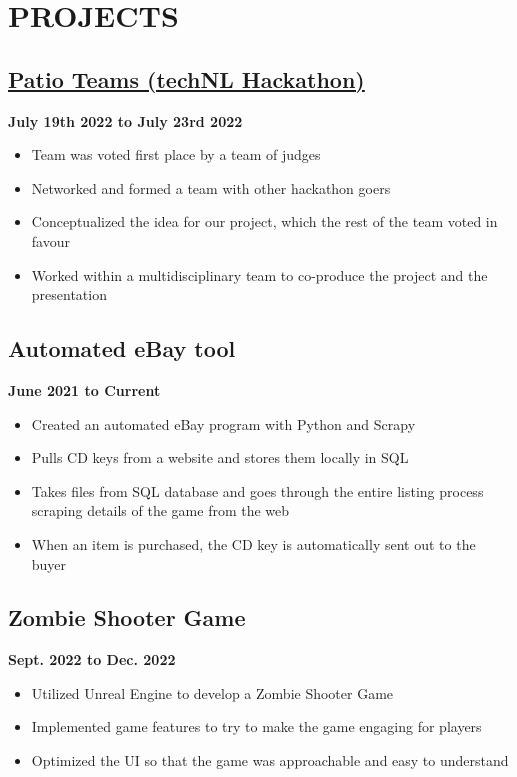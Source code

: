 \documentclass[12pt]{extarticle}
\begin{document}
\section*{PROJECTS}
\subsection*{\href{https://technl.ca/2022/07/28/techfwd-conclusion/}{Patio Teams (techNL Hackathon)}
} \hfill \textbf{July 19th 2022 to July 23rd 2022}
\begin{itemize}
	\item Team was voted first place by a team of judges
  \item Networked and formed a team with other hackathon goers
  \item Conceptualized the idea for our project, which the rest of the team voted in favour
  \item Worked within a multidisciplinary team to co-produce the project and the presentation
\end{itemize}

\subsection*{Automated eBay tool} \hfill \textbf{June 2021 to Current}
\begin{itemize}
  \item Created an automated eBay program with Python and Scrapy
  \item Pulls CD keys from a website and stores them locally in SQL
  \item Takes files from SQL database and goes through the entire listing process scraping details of the game from the web
  \item When an item is purchased, the CD key is automatically sent out to the buyer
\end{itemize}

\subsection*{Zombie Shooter Game} \hfill \textbf{Sept. 2022 to Dec. 2022}
\begin{itemize}
  \item Utilized Unreal Engine to develop a Zombie Shooter Game
  \item Implemented game features to try to make the game engaging for players
  \item Optimized the UI so that the game was approachable and easy to understand
\end{itemize}
\end{document}

